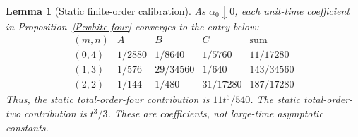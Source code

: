 \documentclass[12pt,oneside,openany]{book}
\numberwithin{equation}{section}
\newtheorem{lemma}[theorem]{Lemma}
\theoremstyle{nogostyle}
\theoremstyle{definition}
\begin{document}


\begin{lemma}[Static finite-order calibration]\label{L:static-four}
  As $\alpha_0\downarrow0$, each unit-time coefficient in
  Proposition~\ref{P:white-four} converges to the entry below:
  \begin{equation}\label{E:static-four-table}
    \begin{array}{c|ccc|c}
      (m,n)&A&B&C&\text{sum}\\ \hline
      (0,4)&1/2880&1/8640&1/5760&11/17280\\
      (1,3)&1/576&29/34560&1/640&143/34560\\
      (2,2)&1/144&1/480&31/17280&187/17280
    \end{array}
  \end{equation}
  Thus, the static total-order-four contribution is $11t^6/540$. The static
  total-order-two contribution is $t^3/3$. These are coefficients, not
  large-time asymptotic constants.
\end{lemma}
\end{document}
